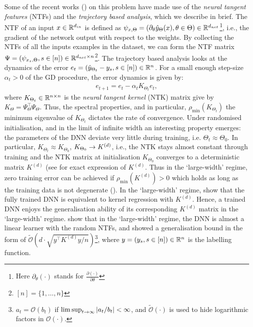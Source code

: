 Some of the recent works () on this problem have made use of the \emph{neural tangent features} (NTFs) and the \emph{trajectory based analysis}, which we describe in brief. The NTF of an input $x\in \mathbb{R}^{d_{in}}$ is defined as $\psi_{x,\Theta}=\left(\partial_{\theta}\hat{y}_{\Theta}(x),\theta\in\Theta\right)\in\mathbb{R}^{d_{net}}$\footnote{Here $\partial_{\theta}(\cdot)$ stands for $\frac{\partial (\cdot)}{\partial \theta}$}, i.e., the gradient of the network output with respect to the weights. By collecting the NTFs of all the inputs examples in the dataset, we can form the NTF matrix $\Psi=(\psi_{x_s,\Theta},s\in[n])\in\mathbb{R}^{d_{net}\times n}$\footnote{$[n]=\{1,\ldots,n\}$}. The trajectory based analysis looks at the dynamics of the error $e_t=(\hat{y}_{\Theta_t}-y_s,s\in[n])\in\mathbb{R}^n$. For a small enough step-size $\alpha_t>0$ of the GD procedure, the error dynamics is given by:
\begin{align}
e_{t+1}=e_t-\alpha_t K_{\Theta_t} e_t,
\end{align}
where $K_{\Theta_t}\in\mathbb{R}^{n\times n}$ is the \emph{neural tangent kernel} (NTK) matrix give by $K_{\Theta}=\Psi^\top_{\Theta} \Psi_{\Theta}$. Thus, the spectral properties, and in particular, $\rho_{\min}(K_{\Theta_t})$ the minimum eigenvalue of $K_{\Theta_t}$ dictates the rate of convergence. Under randomised initialisation, and in the limit of infinite width an interesting property emerges: the parameters of the DNN deviate very little during training, i.e. $\Theta_t\approx \Theta_0$. In particular, $K_{\Theta_t}\approx K_{\Theta_0}$, $K_{\Theta_0}\rightarrow K^{(d)}$, i.e., the NTK stays almost constant through training and the NTK matrix at initialisation $K_{\Theta_0}$ converges to a deterministic matrix $K^{(d)}$ (see  for exact expression of $K^{(d)}$. Thus in the `large-width' regime, zero training error can be achieved if $\rho_{\min}(K^{(d)})>0$ which holds as long as the training data is not degenerate (). In the `large-width' regime, \cite{arora2019exact} show that the fully trained DNN is equivalent to kernel regression with $K^{(d)}$. Hence, a trained DNN enjoys the generalisation ability of its corresponding $K^{(d)}$ matrix in the `large-width' regime. \cite{cao2019generalization} show that in the `large-width' regime, the DNN is almost a linear learner with the random NTFs, and showed a generalisation bound in the form of $\tilde{\mathcal{O}}\left(d\cdot\sqrt{y^\top K^{(d)} y/n}\right)$\footnote{$a_t=\mathcal{O}(b_t)$ if $\lim\sup_{t\rightarrow\infty}|a_t/b_t|<\infty$, and $\tilde{\mathcal{O}}(\cdot)$ is used to hide logarithmic factors in $\mathcal{O}(\cdot)$.}, where $y=(y_s,s\in[n])\in\mathbb{R}^n$ is the labelling function.

